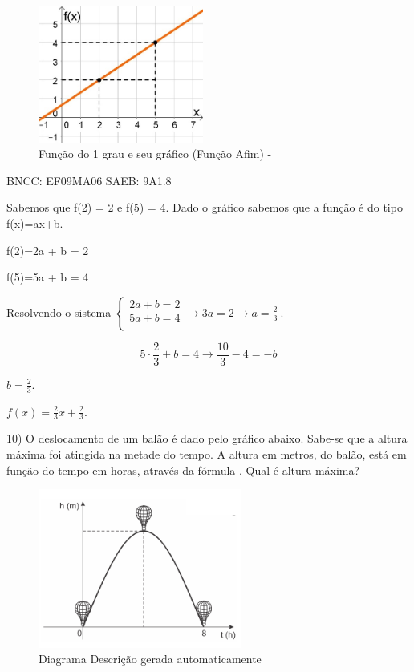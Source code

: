 \begin{escolha}
{{{\begin{escolha}
{\begin{figure}
\centering
\includegraphics[width=2.14105in,height=1.76667in]{./_SAEB_9_MAT/media/image150.jpeg}
\caption{Função do 1 grau e seu gráfico (Função Afim) -}
\end{figure}

BNCC: EF09MA06 SAEB: 9A1.8

Sabemos que f(2) = 2 e f(5) = 4. Dado o gráfico sabemos que a função é
do tipo f(x)=ax+b.

f(2)=2a + b = 2

f(5)=5a + b = 4

Resolvendo o sistema
\(\left\{ \begin{matrix} 2a + b = 2 \\ 5a + b = 4 \\ \end{matrix} \rightarrow 3a = 2 \rightarrow a = \frac{2}{3} \right.\ \).

\[5 \cdot \frac{2}{3} + b = 4 \rightarrow \frac{10}{3} - 4 = - b\]

\(b = \frac{2}{3}\).

\(f\left( x \right) = \frac{2}{3}x + \frac{2}{3}\).

10) O deslocamento de um balão é dado pelo gráfico abaixo. Sabe-se que a
altura máxima foi atingida na metade do tempo. A altura em metros, do
balão, está em função do tempo em horas, através da fórmula . Qual é
altura máxima?

\begin{figure}
\centering
\includegraphics[width=2.62523in,height=2.05851in]{./_SAEB_9_MAT/media/image154.png}
\caption{Diagrama Descrição gerada automaticamente}
\end{figure}

}
\end{escolha}}}}
\end{escolha}
